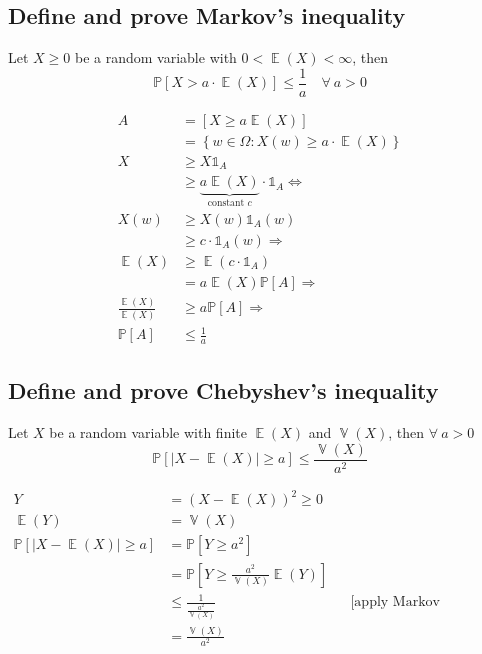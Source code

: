 \documentclass[a4paper]{article}
\newcommand\os[2][P]{\mathbb{#1}\left[#2\right]}
\newcommand\set[1]{\left\{#1\right\}}
\newcommand\card[1]{\left|#1\right|}
\newcommand\ind{\mathbb{1}}
\DeclareMathOperator{\Ex}{\mathbb{E}}
\DeclareMathOperator{\Va}{\mathbb{V}}
\theoremstyle{definition}
\begin{document}
\subsection{Define and prove Markov's inequality}

\begin{mdframed}
  Let $X \geq 0$ be a random variable with $0 < \Ex(X) < \infty$, then 
  \[ \os{X > a \cdot \Ex(X)} \leq \frac1a \quad\forall\: a > 0 \]
\end{mdframed}

\begin{align*}
  A                     &= [X \geq a \Ex(X)] \\
                        &= \set{w \in \Omega: X(w) \geq a \cdot \Ex(X)} \\
  X                     &\geq X \ind_A \\
                        &\geq \underbrace{a \Ex(X)}_{\text{constant } c} \cdot \ind_A \Leftrightarrow \\
  X(w)                  &\geq X(w) \ind_A(w) \\
                        &\geq c \cdot \ind_A(w) \Rightarrow \\
  \Ex(X)                &\geq \Ex(c \cdot \ind_A) \\
                        &= a\Ex(X) \os A \Rightarrow \\
  \frac{\Ex(X)}{\Ex(X)} &\geq a \os A \Rightarrow \\
  \os A                 &\leq \frac 1a
\end{align*}

\subsection{Define and prove Chebyshev's inequality}

\begin{mdframed}
  Let $X$ be a random variable with finite $\Ex(X)$ and $\Va(X)$, then $\forall\: a > 0$
  \[ \os{\card{X - \Ex(X)} \geq a} \leq \frac{\Va(X)}{a^2} \]
\end{mdframed}

\begin{align*}
  Y      &= (X - \Ex(X))^2 \geq 0 \\
  \Ex(Y) &= \Va(X) \\
  \os{\card{X - \Ex(X)} \geq a}
         &= \os{Y \geq a^2} \\
         &= \os{Y \geq \frac{a^2}{\Va(X)} \Ex(Y)} \\
         &\leq \frac{1}{\frac{a^2}{\Va(X)}}  && \text{[apply Markov inequality]} \\
         & = \frac{\Va(X)}{a^2}
\end{align*}
\end{document}
